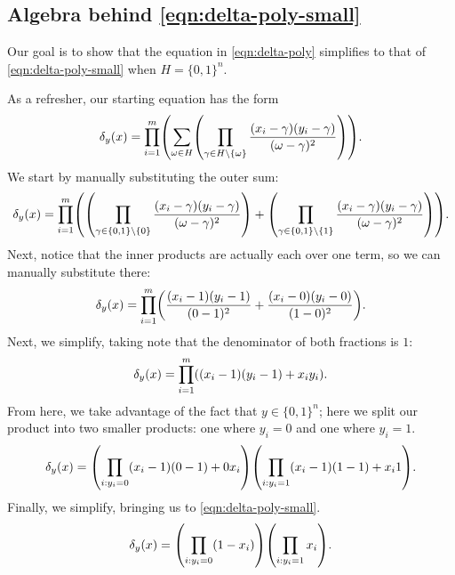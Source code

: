 \documentclass[english,12pt]{reedthesis}
\theoremstyle{plain}
\theoremstyle{definition}
\theoremstyle{remark}
\begin{document}
\begin{appendices}
\section{Algebra behind \cref{eqn:delta-poly-small}}\label{sec:delta-poly-small}

Our goal is to show that the equation in \cref{eqn:delta-poly} simplifies to
that of \cref{eqn:delta-poly-small} when $H = \{0, 1\}^{n}$.

As a refresher, our starting equation has the form
\begin{equation}
  \delta_{y}(x) = \prod_{i = 1}^{m}\mleft(\sum_{\omega \in H}\mleft(
  \prod_{\gamma \in H \setminus \{\omega\}}\frac{(x_{i} - \gamma)(y_{i} - \gamma)}{(\omega - \gamma)^{2}}
  \mright)\mright).
\end{equation}
We start by manually substituting the outer sum:
\begin{equation}
  \delta_{y}(x) = \prod_{i = 1}^{m}\mleft(\mleft(
    \prod_{\gamma \in \{0, 1\} \setminus \{0\}}\frac{(x_{i} - \gamma)(y_{i} - \gamma)}{(\omega - \gamma)^{2}}
    \mright) + \mleft(
    \prod_{\gamma \in \{0, 1\} \setminus \{1\}}\frac{(x_{i} - \gamma)(y_{i} - \gamma)}{(\omega - \gamma)^{2}}
    \mright)
  \mright).
\end{equation}
Next, notice that the inner products are actually each over one term, so we can
manually substitute there:
\begin{equation}
  \delta_{y}(x) = \prod_{i = 1}^{m}\mleft(
    \frac{(x_{i} - 1)(y_{i} - 1)}{(0 - 1)^{2}} +
    \frac{(x_{i} - 0)(y_{i} - 0)}{(1 - 0)^{2}}
  \mright).
\end{equation}
Next, we simplify, taking note that the denominator of both fractions is $1$:
\begin{equation}
  \delta_{y}(x) = \prod_{i = 1}^{m}\mleft((x_{i} - 1)(y_{i} - 1) + x_{i}y_{i}\mright).
\end{equation}
From here, we take advantage of the fact that $y \in \{0, 1\}^{n}$; here we split
our product into two smaller products: one where $y_{i} = 0$ and one where
$y_{i} = 1$.
\begin{equation}
  \delta_{y}(x) = \mleft(\prod_{i:y_{i}=0}(x_{i} - 1)(0 - 1) + 0x_{i}\mright)
  \mleft(\prod_{i:y_{i}=1}(x_{i} - 1)(1 - 1) + x_{i}1\mright).
\end{equation}
Finally, we simplify, bringing us to \cref{eqn:delta-poly-small}.
\begin{equation}
  \delta_{y}(x) = \mleft(\prod_{i:y_{i}=0}(1 - x_{i})\mright)\mleft(\prod_{i:y_{i}=1}x_{i}\mright).
\end{equation}


\end{appendices}
\end{document}
